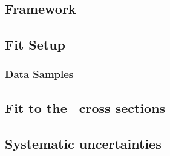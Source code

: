 \subsection{\fastnlo Framework}
\label{subsec:fastnlo}


%

\subsection{Fit Setup}
\label{subsec:fitsettings}


\subsubsection{Data Samples}
\label{subsec:aspdffitdata}


\subsection{Fit to the \dsdetjetb~cross sections}
\label{subsec:doubledifasfit}


\subsection{Systematic uncertainties}
\label{subsec:assysunc}

